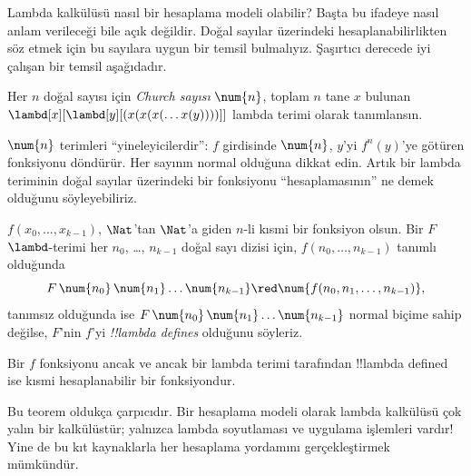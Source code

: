 


Lambda kalkülüsü nasıl bir hesaplama modeli olabilir? Başta bu ifadeye nasıl
anlam verileceği bile açık değildir. Doğal sayılar üzerindeki
hesaplanabilirlikten söz etmek için bu sayılara uygun bir temsil bulmalıyız.
Şaşırtıcı derecede iyi çalışan bir temsil aşağıdadır.

\begin{defn}
Her $n$ doğal sayısı için \emph{Church sayısı} $\num{n}$, toplam $n$ tane
$x$ bulunan $\lambd[x][\lambd[y][(x(x(x(\dots x(y))))]]$ lambda terimi
olarak tanımlansın.
\end{defn}

$\num{n}$ terimleri ``yineleyicilerdir'': $f$ girdisinde $\num{n}$, $y$'yi
$f^n(y)$'ye götüren fonksiyonu döndürür. Her sayının normal olduğuna dikkat
edin. Artık bir lambda teriminin doğal sayılar üzerindeki bir fonksiyonu
``hesaplamasının'' ne demek olduğunu söyleyebiliriz.

\begin{defn}
$f(x_0,\dots,x_{k-1})$, $\Nat$'tan $\Nat$'a giden $n$-li kısmi bir fonksiyon
olsun. Bir $F$ $\lambd$-terimi her $n_0$, \dots, $n_{k-1}$ doğal sayı dizisi
için, $f(n_0,\dots,n_{k-1})$ tanımlı olduğunda
\[
F\, \num{n_0}\, \num{n_1} \dots \num{n_{k-1}} \red \num{f(n_0, n_1, \dots,
  n_{k-1})},
\]
tanımsız olduğunda ise $F\,\num{n_0}\,\num{n_1}\dots\num{n_{k-1}}$ normal
biçime sahip değilse, $F$'nin $f$'yi \emph{!!{lambda define}s} olduğunu
söyleriz.
\end{defn}

\begin{thm}
Bir $f$ fonksiyonu ancak ve ancak bir lambda terimi tarafından
!!{lambda defined} ise kısmi hesaplanabilir bir fonksiyondur.
\end{thm}

\begin{explain}
Bu teorem oldukça çarpıcıdır. Bir hesaplama modeli olarak lambda kalkülüsü
çok yalın bir kalkülüstür; yalnızca lambda soyutlaması ve uygulama işlemleri
vardır!{} Yine de bu kıt kaynaklarla her hesaplama yordamını gerçekleştirmek
mümkündür.
\end{explain}

